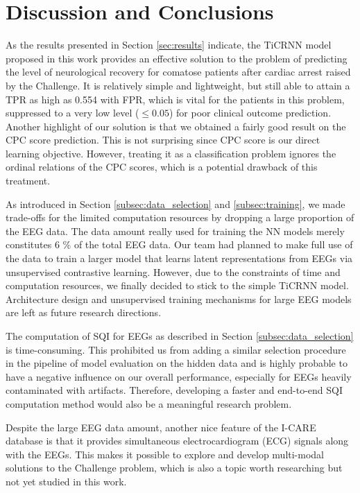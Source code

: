 \section{Discussion and Conclusions}
\label{sec:discu}


As the results presented in Section \ref{sec:results} indicate, the TiCRNN model proposed in this work provides an effective solution to the problem of predicting the level of neurological recovery for comatose patients after cardiac arrest raised by the Challenge. It is relatively simple and lightweight, but still able to attain a TPR as high as 0.554 with FPR, which is vital for the patients in this problem, suppressed to a very low level ($\le 0.05$) for poor clinical outcome prediction. Another highlight of our solution is that we obtained a fairly good result on the CPC score prediction. This is not surprising since CPC score is our direct learning objective. However, treating it as a classification problem ignores the ordinal relations of the CPC scores, which is a potential drawback of this treatment. 

As introduced in Section \ref{subsec:data_selection} and \ref{subsec:training}, we made trade-offs for the limited computation resources by dropping a large proportion of the EEG data. The data amount really used for training the NN models merely constitutes 6 \% of the total EEG data. Our team had planned to make full use of the data to train a larger model that learns latent representations from EEGs via unsupervised contrastive learning. However, due to the constraints of time and computation resources, we finally decided to stick to the simple TiCRNN model. Architecture design and unsupervised training mechanisms for large EEG models are left as future research directions.

The computation of SQI for EEGs as described in Section \ref{subsec:data_selection} is time-consuming. This prohibited us from adding a similar selection procedure in the pipeline of model evaluation on the hidden data and is highly probable to have a negative influence on our overall performance, especially for EEGs heavily contaminated with artifacts. Therefore, developing a faster and end-to-end SQI computation method would also be a meaningful research problem.

Despite the large EEG data amount, another nice feature of the I-CARE database is that it provides simultaneous electrocardiogram (ECG) signals along with the EEGs. This makes it possible to explore and develop multi-modal solutions to the Challenge problem, which is also a topic worth researching but not yet studied in this work.
